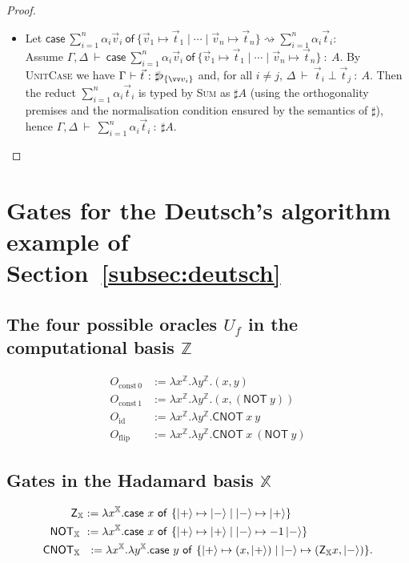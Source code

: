 \documentclass[a4paper,UKenglish,numberwithinsect,pdfa,anonymous]{lipics-v2021}
\theoremstyle{restatestyle}
\newcommand\ket[1]{\ensuremath{|#1\rangle}}
\def\Pair#1#2{(#1,#2)} %
\def\Lam#1#2#3{\lambda#1^{#2}{.}#3} %
\def\case#1#2#3#4#5{\ensuremath{\mathsf{case}~#1~\mathsf{of}~\{#2\mapsto #4 \mid #3\mapsto #5\}}}
\def\gencase#1#2#3#4#5{\ensuremath{\mathsf{case}~#1~\mathsf{of}~\{#2\mapsto #4 \mid \dotsb \mid #3\mapsto #5\}}}
\def\lraneq{\rightsquigarrow}
\def\TYP#1#2#3{#1~{\vdash}~#2~{:}~#3}
\def\SORTH#1#2#3#4{#1~{\vdash}~#2\perp#3~{:}~#4}
\newcommand\B{\mathbb Z}
\newcommand\XB{\mathbb X}
\newcommand{\cnot}[2]{\mathsf{CNOT}\ #1\ #2}
\newcommand{\pauliX}[1]{\mathsf{NOT}\ #1}
\newcommand{\pauliZXB}{\mathsf{Z}_{\XB}}
\newcommand{\cnotXB}[2]{\mathsf{CNOT}_{\XB}\ #1\ #2}
\newcommand{\pauliXXB}[1]{\mathsf{NOT}_{\XB}\ #1}
\newcommand\basis[1]{\ensuremath{\flat_{#1}}}
\begin{document}
\begin{proof}
\begin{itemize}
    \item Let
      $\gencase{\sum_{i=1}^n\alpha_i\vec{v}_{i}}{\vec{v}_{1}}{\vec{v}_{n}}{\vec{t}_{1}}{\vec{t}_{n}}
      \lraneq \sum_{i=1}^n\alpha_i\vec{t}_{i}$: \\ Assume 
      $\TYP{\Gamma,\Delta}{\gencase{\sum_{i=1}^n\alpha_i\vec{v}_{i}}{\vec{v}_{1}}{\vec{v}_{n}}{\vec{t}_{1}}{\vec{t}_{n}}}{A}$.
      By \textsc{UnitCase} we have $\TYP{\Gamma}{\vec t}{\sharp\basis{\{\vv
      v_i\}}}$ and, for all $i\neq j$, $\SORTH{\Delta}{\vec t_i}{\vec t_j}{A}$.
      Then the reduct $\sum_{i=1}^{n}\alpha_i \vec{t}_{i}$ is typed by \textsc{Sum}
      as $\sharp A$ (using the orthogonality premises and the normalisation
      condition ensured by the semantics of $\sharp$), hence
      $\TYP{\Gamma,\Delta}{\sum_{i=1}^{n}\alpha_i \vec{t}_{i}}{\sharp A}$.
      \qedhere
  \end{itemize}
\end{proof}

\section{Gates for the Deutsch's algorithm example of Section~\ref{subsec:deutsch}}\label{sec:appendixD}
\subsection{The four possible oracles \texorpdfstring{$U_f$}{Uf} in the computational basis \texorpdfstring{$\B$}{Z}}
\begin{align*}
  O_{\mathrm{const}\,0} &:= \Lam{x}{\B}{\Lam{y}{\B}{\Pair{x}{y}}}\\
  O_{\mathrm{const}\,1} &:= \Lam{x}{\B}{\Lam{y}{\B}{\Pair{x}{(\pauliX{y})}}}\\
  O_{\mathrm{id}}       &:= \Lam{x}{\B}{\Lam{y}{\B}{\cnot{x}{y}}}\\
  O_{\mathrm{flip}}     &:= \Lam{x}{\B}{\Lam{y}{\B}{\cnot{x}{(\pauliX{y})}}}
\end{align*}

\subsection{Gates in the Hadamard basis \texorpdfstring{$\XB$}{X}}
\begin{align*}
  \pauliZXB &:= \Lam{x}{\XB}{\case{x}{\ket{+}}{\ket{-}}{\ket{-}}{\ket{+}}}\\
  \pauliXXB &:= \Lam{x}{\XB}{\case{x}{\ket{+}}{\ket{-}}{\ket{+}}{-1\,\ket{-}}}\\
  \cnotXB &:= \Lam{x}{\XB}{\Lam{y}{\XB}{
      \case{y}{\ket{+}}{\ket{-}}
      {\Pair{x}{\ket{+}}}
      {\Pair{\pauliZXB{x}}{\ket{-}}}
  }}.
\end{align*}
\end{document}
